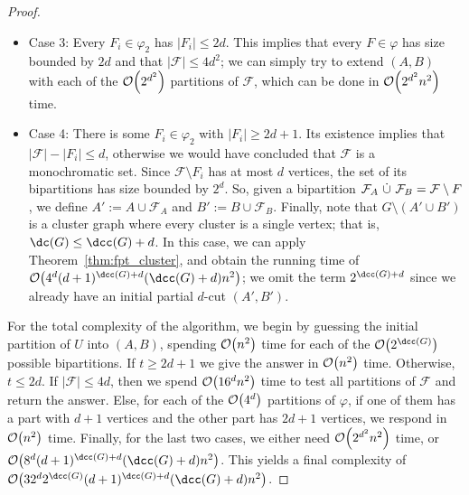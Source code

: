 \begin{proof}
    \begin{itemize}
        \item Case 3: Every $F_i \in \varphi_2$ has $|F_i| \leq 2d$. This implies that every $F \in \varphi$ has size bounded by $2d$ and that $|\mathcal{F}| \leq 4d^2$; we can simply try to extend $(A, B)$ with each of the $\mathcal{O}\!\left(2^{d^2}\right)$ partitions of $\mathcal{F}$, which can be done in $\mathcal{O}\!\left(2^{d^2}n^2\right)$ time.

        \item Case 4: There is some $F_i \in \varphi_2$ with $|F_i| \geq 2d + 1$.
        Its existence implies that $|\mathcal{F}| - |F_i| \leq d$, otherwise we would have concluded that $\mathcal{F}$ is a monochromatic set.
        Since $\mathcal{F} \setminus F_i$ has at most $d$ vertices, the set of its bipartitions has size bounded by $2^d$.
        So, given a bipartition $\mathcal{F}_A \ \dot\cup\  \mathcal{F}_B = \mathcal{F} \setminus F$, we define $A' := A \cup \mathcal{F}_A$ and $B' := B \cup \mathcal{F}_B$.
        Finally, note that $G \setminus (A' \cup B')$ is a cluster graph where every cluster is a single vertex; that is, $\dc(G) \leq \dcc(G) + d$.
        In this case, we can apply Theorem~\ref{thm:fpt_cluster}, and obtain the running time of $\bigO{4^d(d+1)^{\dcc(G)+d}(\dcc(G)+d)n^2}$; we omit the term $2^{\dcc(G) + d}$ since we already have an initial partial $d$-cut $(A', B')$.
    \end{itemize}

    For the total complexity of the algorithm, we begin by guessing the initial partition of $U$ into $(A,B)$, spending $\mathcal{O}\!\left(n^2\right)$ time for each of the $\bigO{2^{\dcc(G)}}$ possible bipartitions.
    If $t \geq 2d+1$ we give the answer in $\mathcal{O}\!\left(n^2\right)$ time.
    Otherwise, $t \leq 2d$.
    If $|\mathcal{F}| \leq 4d$, then we spend $\mathcal{O}\!\left(16^dn^2\right)$ time to test all partitions of $\mathcal{F}$ and return the answer.
    Else, for each of the $\mathcal{O}\!\left(4^d\right)$ partitions of $\varphi$, if one of them has a part with $d+1$ vertices and the other part has $2d+1$ vertices, we respond in $\mathcal{O}\!\left(n^2\right)$ time.
    Finally, for the last two cases, we either need $\mathcal{O}\!\left(2^{d^2}n^2\right)$ time, or $\bigO{8^d(d+1)^{\dcc(G)+d}(\dcc(G)+d)n^2}$.
    This yields a final complexity of $\bigO{32^d2^{\dcc(G)}(d+1)^{\dcc(G)+d}(\dcc(G)+d)n^2}$.
\end{proof}



